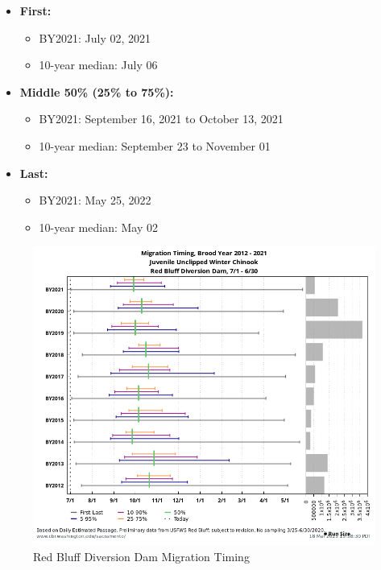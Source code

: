 \documentclass[
]{book}
\providecommand{\tightlist}{%
  \setlength{\itemsep}{0pt}\setlength{\parskip}{0pt}}
\theoremstyle{definition}
\theoremstyle{definition}
\theoremstyle{definition}
\theoremstyle{definition}
\theoremstyle{remark}
\begin{document}
\begin{itemize}
\tightlist
\item
  \textbf{First:}

  \begin{itemize}
  \tightlist
  \item
    BY2021: July 02, 2021
  \item
    10-year median: July 06
  \end{itemize}
\item
  \textbf{Middle 50\% (25\% to 75\%):}

  \begin{itemize}
  \tightlist
  \item
    BY2021: September 16, 2021 to October 13, 2021
  \item
    10-year median: September 23 to November 01
  \end{itemize}
\item
  \textbf{Last:}

  \begin{itemize}
  \tightlist
  \item
    BY2021: May 25, 2022
  \item
    10-year median: May 02
  \end{itemize}
\end{itemize}

\begin{figure}
\includegraphics[width=1.5\linewidth]{figures/migtiming2021_rbdd} \caption{Red Bluff Diversion Dam Migration Timing}\label{fig:rbdd-timing-fig}
\end{figure}
\end{document}
